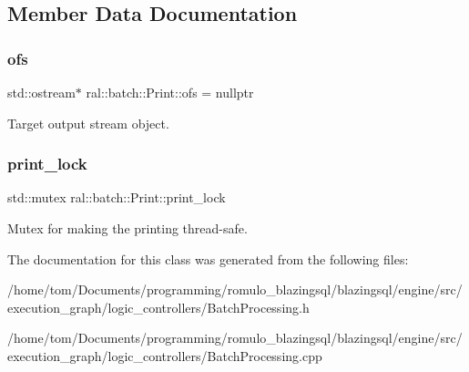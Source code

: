 \subsection{Member Data Documentation}
\mbox{\label{classral_1_1batch_1_1Print_ac8e0a4119f3eff330f4b69bdafeb97d4}} 
\subsubsection{\texorpdfstring{ofs}{ofs}}
{\footnotesize\ttfamily std\+::ostream$\ast$ ral\+::batch\+::\+Print\+::ofs = nullptr\hspace{0.3cm}{\ttfamily [protected]}}

Target output stream object. \mbox{\label{classral_1_1batch_1_1Print_a655fa9f15b425b603f69476e8fd0059d}} 
\subsubsection{\texorpdfstring{print\+\_\+lock}{print\_lock}}
{\footnotesize\ttfamily std\+::mutex ral\+::batch\+::\+Print\+::print\+\_\+lock\hspace{0.3cm}{\ttfamily [protected]}}

Mutex for making the printing thread-\/safe. 

The documentation for this class was generated from the following files\+:\begin{DoxyCompactItemize}
\item 
/home/tom/\+Documents/programming/romulo\+\_\+blazingsql/blazingsql/engine/src/execution\+\_\+graph/logic\+\_\+controllers/Batch\+Processing.\+h\item 
/home/tom/\+Documents/programming/romulo\+\_\+blazingsql/blazingsql/engine/src/execution\+\_\+graph/logic\+\_\+controllers/Batch\+Processing.\+cpp\end{DoxyCompactItemize}
